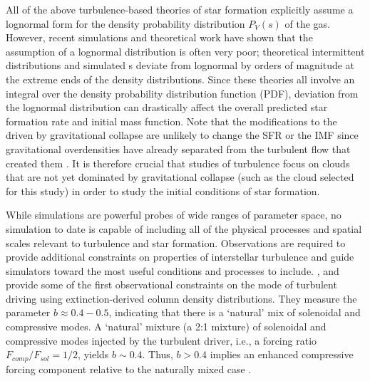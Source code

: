 
All of the above turbulence-based theories of star formation explicitly assume a
lognormal form for the density probability distribution $P_V(s)$ of the gas. %
However, recent simulations \citep{Kritsuk2007a, Schmidt2009a, Federrath2010a, Konstandin2012a, Federrath2013a, Federrath2013b} and theoretical work
\citep{Hopkins2013a} have shown that the assumption of a
lognormal distribution is often very poor; theoretical intermittent distributions and 
simulated \rhoPDF s deviate from lognormal by orders of magnitude
at the extreme ends of the density distributions.  Since these theories all involve
an integral over the density probability distribution function (PDF), deviation from
the lognormal distribution can drastically affect the overall predicted star formation
rate \citep[e.g.][]{Cho2011a,Collins2012a} and initial mass function.
Note that the modifications to the \rhoPDF driven by gravitational collapse
are unlikely to change the SFR or the IMF since gravitational overdensities have already
separated from the turbulent flow that created them
\citep{Klessen2000a,Kritsuk2011a,Federrath2012a,Federrath2013a}. It is therefore crucial that
studies of turbulence focus on clouds that are not yet dominated by
gravitational collapse (such as the cloud selected for this study) in order to study the initial conditions of star formation.

While simulations are powerful probes of wide ranges of parameter space, no
simulation to date is capable of including all of the physical processes and spatial
scales relevant to turbulence and star formation.  Observations are required to provide additional
constraints on properties of interstellar turbulence and guide simulators
toward the most useful conditions and processes to include.
\citet{Brunt2010c}, \citet{Kainulainen2012a} and \citet{Kainulainen2013a}
provide some of the first observational constraints on the mode of turbulent
driving using extinction-derived column density distributions.
They measure the parameter $b\approx0.4-0.5$, indicating that there is a `natural' mix of solenoidal
and compressive modes.  A `natural' mixture (a 2:1 mixture) of solenoidal and
compressive modes injected by the turbulent driver, i.e., a forcing ratio
$F_{comp}/F_{sol} = 1/2$, yields $b\sim0.4$. Thus, $b>0.4$ implies an enhanced
compressive forcing component relative to the naturally mixed case \citep[see
Figure 8 in][]{Federrath2010a}.


